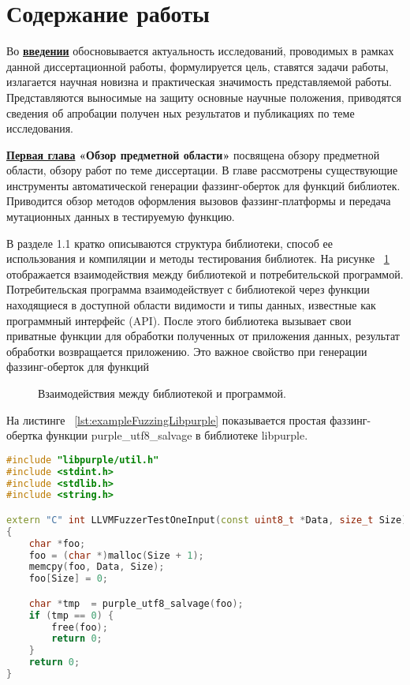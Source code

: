 
\section*{Содержание работы}
Во \underline{\textbf{введении}} обосновывается актуальность исследований, проводимых  в рамках данной диссертационной работы, формулируется цель, ставятся задачи работы, излагается научная новизна и практическая значимость представляемой работы. Представляются выносимые на защиту основные научные положения, приводятся сведения об апробации получен­ ных результатов и публикациях по теме исследования.

\underline{\textbf{Первая глава}} {\textbf{«Обзор предметной области»}} посвящена обзору предметной области, обзору работ по теме диссертации. В главе рассмотрены существующие инструменты автоматической генерации фаззинг-оберток для функций библиотек. Приводится обзор методов оформления вызовов фаззинг-платформы и передача мутационных данных в тестируемую функцию.

В разделе 1.1 кратко описываются структура библиотеки, способ ее использования и компиляции и методы тестирования библиотек. На рисунке ~\cref{fig:LibraryInterface} отображается взаимодействия между библиотекой и потребительской программой.  Потребительская программа взаимодействует с библиотекой через функции находящиеся в доступной области видимости и типы данных, известные как программный интерфейс (API). После этого библиотека вызывает свои приватные функции для обработки полученных от приложения данных, результат обработки возвращается приложению. Это важное свойство при генерации фаззинг-оберток для функций 

\begin{figure}[ht]
    \caption{Взаимодействия между библиотекой и программой.}\label{fig:LibraryInterface}
\end{figure}

На листинге ~\cref{lst:exampleFuzzingLibpurple} показывается простая фаззинг-обертка функции purple\_utf8\_salvage в библиотеке libpurple. 

\begin{lstlisting}[language=C++,frame=single,caption={Простой пример фаззинг-обертки},label=lst:exampleFuzzingLibpurple]
#include "libpurple/util.h"
#include <stdint.h>
#include <stdlib.h>
#include <string.h>

extern "C" int LLVMFuzzerTestOneInput(const uint8_t *Data, size_t Size) 
{
    char *foo;
    foo = (char *)malloc(Size + 1);
    memcpy(foo, Data, Size);
    foo[Size] = 0;

    char *tmp  = purple_utf8_salvage(foo);
    if (tmp == 0) {
        free(foo);
        return 0;
    }
    return 0;
}\end{lstlisting} 


